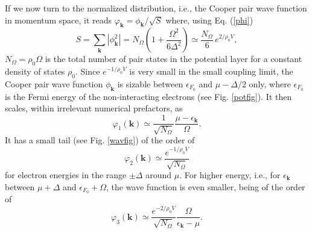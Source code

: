 \documentclass[twocolumn,showpacs]{revtex4}
\def\v#1{\mathbf{#1}}
\begin{document}
If we now turn to the normalized distribution, i.e., the Cooper pair wave function in momentum space, it reads $\varphi_{\v k}=\phi_{\v k}/\sqrt{S}$ where, using Eq. (\ref{phi})
\begin{equation}
S=\sum_{\v k}|\phi_{\v k}^2|=N_{\Omega}(1+\frac{\Omega^2}{6\Delta^2})\simeq \frac{N_{\Omega}}{6}\,e^{2/\rho_0V},
\end{equation}
 $N_{\Omega}=\rho_0\Omega$ is the total number of pair states in the potential layer for a constant density of states $\rho_0$. Since  $e^{-1/\rho_0V}$ is very small in the small coupling limit, the Cooper pair wave function $\phi_{\v{k}}$ is sizable between $\epsilon_{F_0}$ and $\mu-\Delta/2$ only, where $\epsilon_{F_0}$  is the Fermi energy of the non-interacting electrons (see Fig. \ref{potfig}). It then  scales, within irrelevant numerical prefactors,  as 
\begin{equation}
\varphi_1(\v k)\simeq \frac{1}{\sqrt{N_{\Omega}}}\frac{\mu-\epsilon_{\v k}}{\Omega}.
\end{equation}
It has a small tail (see Fig. \ref{wavfig}) of the order of
\begin{equation}
\varphi_2(\v k)\simeq \frac{e^{-1/\rho_0V}}{\sqrt{N_{\Omega}}}
\end{equation}
for electron energies in the range $\pm \Delta$ around $\mu$. For higher energy, i.e., for $\epsilon_{\v k}$ between $\mu+\Delta$ and $\epsilon_{F_0}+\Omega$, the wave function is even smaller, being of the order of 
\begin{equation}
\varphi_3(\v k)\simeq \frac{e^{-2/\rho_0V}}{\sqrt{N_{\Omega}}}\frac{\Omega}{\epsilon_{\v k}-\mu}.
\end{equation}
\end{document}
